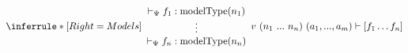 \begin{equation*}
    \inferrule*[Right=Models]
    {
        {\begin{array}{c}
            \vdash_\networkTheoryVar \networkImplementation_1 : \networkDeclType(\networkDeclVar_1) \\ 
            \vdots \\ 
            \vdash_\networkTheoryVar \networkImplementation_n : \networkDeclType(\networkDeclVar_n)
        \end{array}}
    }
    {
        \queryExpansion \vdash \networkImplementations
    }
\end{equation*}
